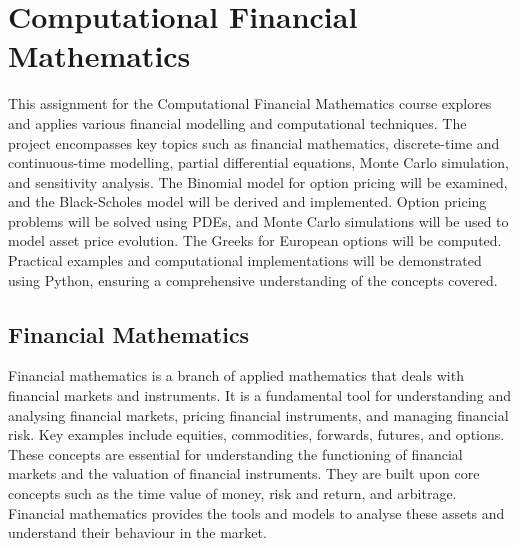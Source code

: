 

%

\chapter{Computational Financial Mathematics}
\label{ch:comp_fin_math}

    This assignment for the Computational Financial Mathematics course explores and applies various financial
    modelling and computational techniques.
    The project encompasses key topics such as financial mathematics, discrete-time and continuous-time modelling,
    partial differential equations, Monte Carlo simulation, and sensitivity analysis.
    The Binomial model for option pricing will be examined, and the Black-Scholes model will be derived and implemented.
    Option pricing problems will be solved using PDEs,
    and Monte Carlo simulations will be used to model asset price evolution.
    The Greeks for European options will be computed.
    Practical examples and computational implementations will be demonstrated using Python,
    ensuring a comprehensive understanding of the concepts covered.

\section{Financial Mathematics}
    \label{sec:fin_math}


    Financial mathematics is a branch of applied mathematics that deals with financial markets and instruments.
    It is a fundamental tool for understanding and analysing financial markets, pricing financial instruments,
    and managing financial risk.
    Key examples include equities, commodities, forwards, futures, and options.
    These concepts are essential for understanding the functioning of financial markets and the valuation of
    financial instruments.
    They are built upon core concepts such as the time value of money, risk and return, and arbitrage.
    Financial mathematics provides the tools and models to analyse these assets and understand their behaviour in the market.

